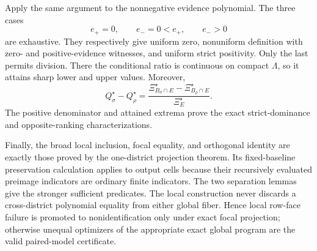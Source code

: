 Apply the same argument to the nonnegative evidence polynomial.  The three cases
\[
e_+=0,
\qquad e_-=0<e_+,
\qquad e_->0
\tag{3}
\]
are exhaustive.  They respectively give uniform zero, nonuniform definition with zero- and positive-evidence witnesses, and uniform strict positivity.  Only the last permits division.  There the conditional ratio is continuous on compact \(\Lambda\), so it attains sharp lower and upper values.  Moreover,
\[
Q_\sigma^\star-Q_\rho^\star
=\frac{\Xi_{B_\sigma\cap E}^\star-
\Xi_{B_\rho\cap E}^\star}{\Xi_E^\star}.
\tag{4}
\]
The positive denominator and attained extrema prove the exact strict-dominance and opposite-ranking characterizations.

Finally, the broad local inclusion, focal equality, and orthogonal identity are exactly those proved by the one-district projection theorem.  Its fixed-baseline preservation calculation applies to output cells because their recursively evaluated preimage indicators are ordinary finite indicators.  The two separation lemmas give the stronger sufficient predicates.  The local construction never discards a cross-district polynomial equality from either global fiber.  Hence local row-face failure is promoted to nonidentification only under exact focal projection; otherwise unequal optimizers of the appropriate exact global program are the valid paired-model certificate.